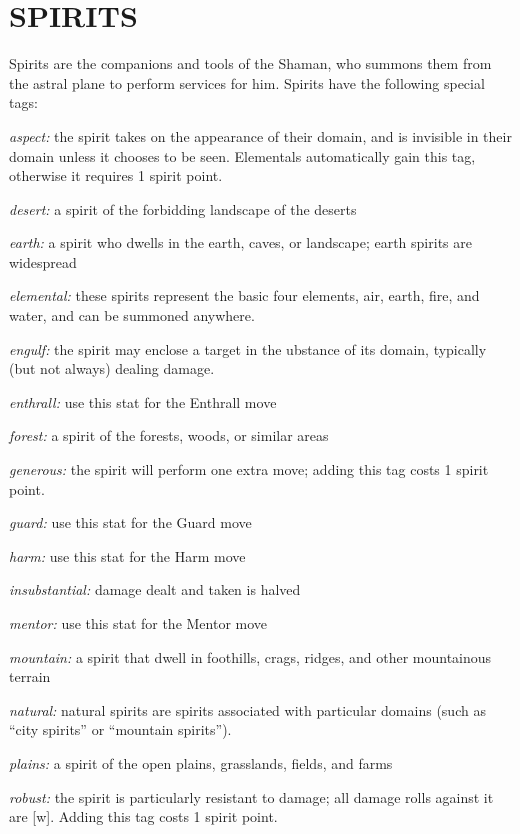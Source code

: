 \documentclass[oneside,10pt]{article}
\begin{document}
\section{SPIRITS}
\begin{multicols}{2}
Spirits are the companions and tools of the Shaman, who
summons them from the astral plane to perform services for
him. Spirits have the following special tags:

\begin{adjustwidth*}{.5cm}{.5cm}
\textit{aspect:} the spirit takes on the appearance of their domain,
and is invisible in their domain unless it chooses to be
seen. Elementals automatically gain this tag, otherwise it
requires 1 spirit point.

\textit{desert:} a spirit of the forbidding landscape of
the deserts

\textit{earth:} a spirit who dwells in the earth, caves, or landscape;
earth spirits are widespread

\textit{elemental:} these spirits represent the basic four elements,
air, earth, fire, and water, and can be summoned
anywhere.

\textit{engulf:} the spirit may enclose a target in the ubstance of its
domain, typically (but not always) dealing damage.

\textit{enthrall:} use this stat for the Enthrall move

\textit{forest:} a spirit of the forests, woods, or similar
areas

\textit{generous:} the spirit will perform one extra move; adding
this tag costs 1 spirit point.

\textit{guard:} use this stat for the Guard move

\textit{harm:} use this stat for the Harm move

\textit{insubstantial:} damage dealt and taken is halved

\textit{mentor:} use this stat for the Mentor move

\textit{mountain:} a spirit that dwell in foothills, crags, ridges, and
other mountainous terrain

\textit{natural:} natural spirits are spirits associated
with particular domains (such as “city spirits” or
“mountain spirits”).

\textit{plains:} a spirit of the open plains, grasslands, fields, and
farms

\textit{robust:} the spirit is particularly resistant to damage; all
damage rolls against it are [w]. Adding this tag costs 1
spirit point.


\end{adjustwidth*}
\end{multicols}
\end{document}
